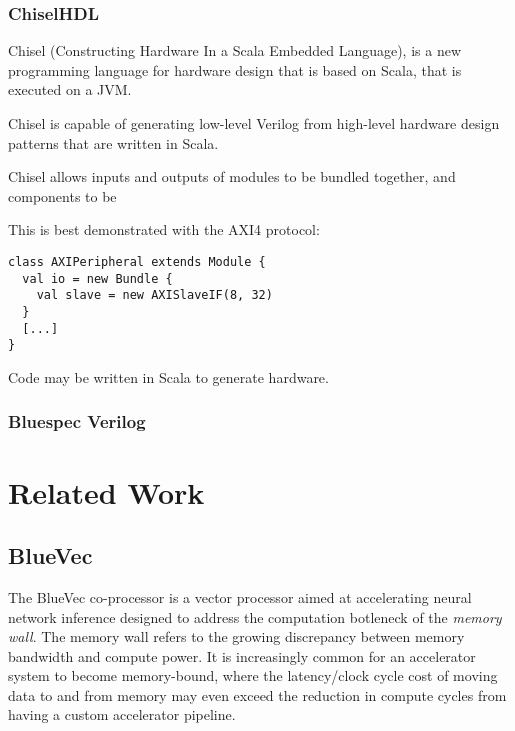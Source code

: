 \documentclass[a4paper,8pt]{report}
\begin{document}
\subsection{ChiselHDL}
Chisel (Constructing Hardware In a Scala Embedded Language), is a new
programming language for hardware design that is based on Scala, that is
executed on a JVM.

Chisel is capable of generating low-level Verilog from high-level hardware
design patterns that are written in Scala.

Chisel allows inputs and outputs of modules to be bundled together, and
components to be


This is best demonstrated with the AXI4 protocol:
\tiny
\begin{verbatim}
class AXIPeripheral extends Module {
  val io = new Bundle {
    val slave = new AXISlaveIF(8, 32)
  }
  [...]
}
\end{verbatim}
\normalsize

Code may be written in Scala to generate hardware.



\subsection{Bluespec Verilog}





\chapter{Related Work} 
\section{BlueVec}
The BlueVec co-processor is a vector processor aimed at accelerating neural
network inference designed to address the computation botleneck of the
\emph{memory wall}.
The memory wall refers to the growing discrepancy between memory bandwidth and
compute power. It is increasingly common for an accelerator system to become
memory-bound, where the latency/clock cycle cost of moving data to and from
memory may even exceed the reduction in compute cycles from having a custom
accelerator pipeline.
\end{document}
